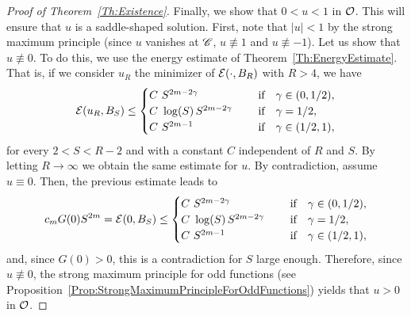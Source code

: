 \begin{proof}[Proof of Theorem~\ref{Th:Existence}]
Finally, we show that $0<u<1$ in $\mathcal{O}$. This will ensure that $u$ is a saddle-shaped solution. First, note that $|u| < 1$ by the strong maximum principle (since $u$ vanishes at $\mathscr{C}$, $u \not \equiv 1$  and $u\not\equiv -1$). Let us show that $u\not\equiv 0$. To do this, we use the energy estimate of Theorem~\ref{Th:EnergyEstimate}. That is, if we consider $u_R$ the minimizer of $\mathcal{E}(\cdot, B_R)$ with $R > 4$, we have
$$
\mathcal{E} (u_R,B_S) \leq \begin{cases}
C \ S^{2m-2\gamma}\ \ \ \ &\textrm{if } \ \ \gamma\in(0,1/2),\\
C\ \log(S)\,S^{2m-2\gamma}\ \ \ \ &\textrm{if } \ \ \gamma=1/2,\\
C \ S^{2m-1}\ \ \ \ &\textrm{if } \ \ \gamma\in(1/2,1),\\
\end{cases} $$
for every $2 < S < R-2$ and with a constant $C$ independent of $R$ and $S$. By letting $R \to \infty$ we obtain the same estimate for $u$. By contradiction, assume $u\equiv 0$. Then, the previous estimate leads to
$$
c_m G(0)S^{2m} = \mathcal{E}(0, B_S) \leq \begin{cases}
C \ S^{2m-2\gamma}\ \ \ \ &\textrm{if } \ \ \gamma\in(0,1/2),\\
C\ \log(S)\,S^{2m-2\gamma}\ \ \ \ &\textrm{if } \ \ \gamma=1/2,\\
C \ S^{2m-1}\ \ \ \ &\textrm{if } \ \ \gamma\in(1/2,1),\\
\end{cases} $$
and, since $G(0)>0$, this is a contradiction for $S$ large enough. Therefore, since $u \not \equiv 0$, the strong maximum principle for odd functions (see Proposition~\ref{Prop:StrongMaximumPrincipleForOddFunctions}) yields that $u>0$ in $\mathcal{O}$. 
\end{proof}

